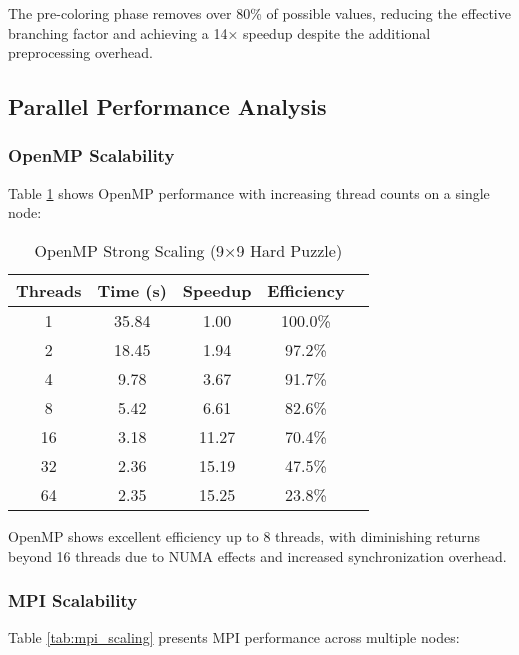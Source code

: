 \documentclass[10pt, conference]{IEEEtran}
\begin{document}
The pre-coloring phase removes over 80\% of possible values, reducing the effective branching factor and achieving a 14× speedup despite the additional preprocessing overhead.

\subsection{Parallel Performance Analysis}

\subsubsection{OpenMP Scalability}
Table \ref{tab:openmp_scaling} shows OpenMP performance with increasing thread counts on a single node:

\begin{table}[htbp]
\caption{OpenMP Strong Scaling (9×9 Hard Puzzle)}
\begin{center}
\begin{tabular}{@{}ccccc@{}}
\toprule
\textbf{Threads} & \textbf{Time (s)} & \textbf{Speedup} & \textbf{Efficiency} \\
\midrule
1 & 35.84 & 1.00 & 100.0\% \\
2 & 18.45 & 1.94 & 97.2\% \\
4 & 9.78 & 3.67 & 91.7\% \\
8 & 5.42 & 6.61 & 82.6\% \\
16 & 3.18 & 11.27 & 70.4\% \\
32 & 2.36 & 15.19 & 47.5\% \\
64 & 2.35 & 15.25 & 23.8\% \\
\bottomrule
\end{tabular}
\end{center}
\label{tab:openmp_scaling}
\end{table}

OpenMP shows excellent efficiency up to 8 threads, with diminishing returns beyond 16 threads due to NUMA effects and increased synchronization overhead.

\subsubsection{MPI Scalability}
Table \ref{tab:mpi_scaling} presents MPI performance across multiple nodes:
\end{document}
